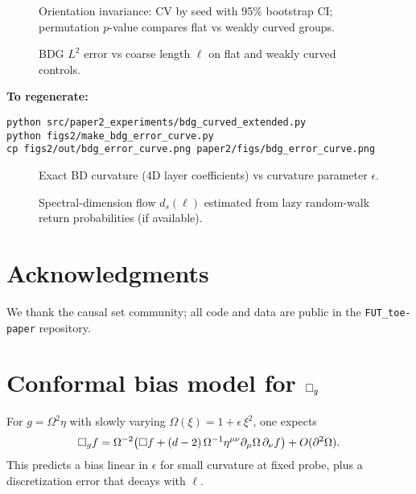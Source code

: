 \begin{figure}[H]
  \centering
  \caption{Orientation invariance: CV by seed with 95\% bootstrap CI; permutation $p$-value compares flat vs weakly curved groups.}
\end{figure}

\begin{figure}[H]
  \centering
  \caption{BDG $L^2$ error vs coarse length $\ell$ on flat and weakly curved controls.}
\end{figure}

\FloatBarrier
\vspace{-0.5em}
{\footnotesize\noindent\textbf{To regenerate:}}
\begin{minipage}{0.96\linewidth}
\begin{verbatim}
python src/paper2_experiments/bdg_curved_extended.py
python figs2/make_bdg_error_curve.py
cp figs2/out/bdg_error_curve.png paper2/figs/bdg_error_curve.png
\end{verbatim}
\end{minipage}

\FloatBarrier
\clearpage

\begin{figure}[H]
  \centering
  \caption{Exact BD curvature (4D layer coefficients) vs curvature parameter $\epsilon$.}
\end{figure}

\begin{figure}[H]
  \centering
  \caption{Spectral-dimension flow $d_s(\ell)$ estimated from lazy random-walk return probabilities (if available).}
\end{figure}

\FloatBarrier
\clearpage

\section*{Acknowledgments}
We thank the causal set community; all code and data are public in the \texttt{FUT\_toe-paper} repository.

\appendix

\section{Conformal bias model for \texorpdfstring{$\Box_g$}{Box\_g}}
For $g=\Omega^2\eta$ with slowly varying $\Omega(\xi)=1+\epsilon\,\xi^2$, one expects
\[
\Box_g f=\Omega^{-2}\!\left(\Box f +(d-2)\,\Omega^{-1}\eta^{\mu\nu}\partial_\mu\Omega\,\partial_\nu f\right)+O(\partial^2\Omega).
\]
This predicts a bias linear in $\epsilon$ for small curvature at fixed probe, plus a discretization error that decays with $\ell$.

